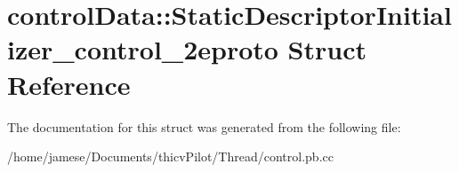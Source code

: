 \hypertarget{structcontrol_data_1_1_static_descriptor_initializer__control__2eproto}{}\section{control\+Data\+:\+:Static\+Descriptor\+Initializer\+\_\+control\+\_\+2eproto Struct Reference}
\label{structcontrol_data_1_1_static_descriptor_initializer__control__2eproto}


The documentation for this struct was generated from the following file\+:\begin{DoxyCompactItemize}
\item 
/home/jamese/\+Documents/thicv\+Pilot/\+Thread/control.\+pb.\+cc\end{DoxyCompactItemize}
